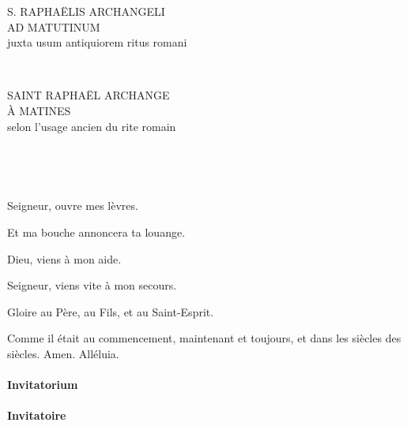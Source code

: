 \documentclass[twoside]{article}
\begin{document}
\null \newpage

\sloppy

\begin{paracol}[1]{2}

\begin{center}\begin{doublespace}

{
\MakeUppercase{\Large S. Raphaëlis Archangeli\\ad Matutinum}\\
juxta usum antiquiorem ritus romani}
\end{doublespace}\end{center}

~~

\switchcolumn

\begin{center}\begin{doublespace}
{
\MakeUppercase{\Large Saint Raphaël Archange\\À Matines}\\
selon l'usage ancien du rite romain}
\end{doublespace}\end{center}

~~

~~

\vv Seigneur, ouvre mes lèvres.

\rr Et ma bouche annoncera ta louange.

\vv Dieu, viens à mon aide.

\rr Seigneur, viens vite à mon secours.

\vv Gloire au Père, au Fils, et au Saint-Esprit.

\rr Comme il était au commencement, maintenant et toujours, et dans les siècles des siècles. Amen. Alléluia.

\switchcolumn*

\paragraph{Invitatorium}


\switchcolumn

\paragraph{Invitatoire}


\end{paracol}
\end{document}
